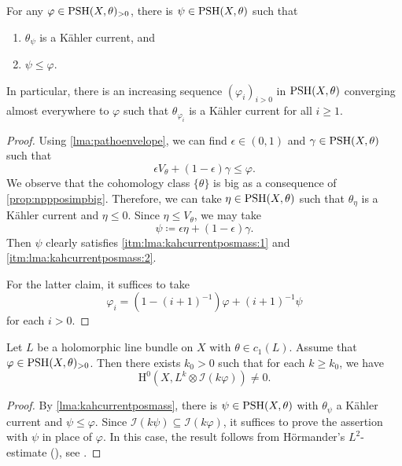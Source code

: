 \begin{lemma}\label{lma:kahcurrentposmass}
    For any $\varphi\in \mathrm{PSH}(X,\theta)_{>0}$, there is $\psi\in \mathrm{PSH}(X,\theta)$ such that
    \begin{enumerate}
        \item\label{itm:lma:kahcurrentposmass:1} $\theta_{\psi}$ is a Kähler current, and
        \item\label{itm:lma:kahcurrentposmass:2} $\psi\leq \varphi$.
    \end{enumerate}
    In particular, there is an increasing sequence $(\varphi_i)_{i>0}$ in $\mathrm{PSH}(X,\theta)$ converging almost everywhere to $\varphi$ such that $\theta_{\varphi_i}$ is a K\"ahler current for all $i\geq 1$.
\end{lemma}
\begin{proof}
    Using \cref{lma:pathoenvelope}, we can find $\epsilon\in (0,1)$ and $\gamma\in \mathrm{PSH}(X,\theta)$ such that
    \[
    \epsilon V_{\theta}+(1-\epsilon)\gamma\leq \varphi.
    \]
    We observe that the cohomology class $\{\theta\}$ is big as a consequence of \cref{prop:nppposimpbig}. Therefore, we can take $\eta\in \mathrm{PSH}(X,\theta)$ such that $\theta_{\eta}$ is a Kähler current and $\eta\leq 0$. Since $\eta\leq V_{\theta}$, we may take
    \[
    \psi\coloneqq \epsilon\eta+(1-\epsilon)\gamma.
    \]
    Then $\psi$ clearly satisfies \ref{itm:lma:kahcurrentposmass:1} and \ref{itm:lma:kahcurrentposmass:2}.

    For the latter claim, it suffices to take
    \[
    \varphi_i=\left(1-(i+1)^{-1}\right)\varphi +(i+1)^{-1}\psi
    \]
    for each $i>0$.
\end{proof}

\begin{lemma}\label{lma:existsecposmass}
    Let $L$ be a holomorphic line bundle on $X$ with $\theta\in c_1(L)$. Assume that $\varphi\in \mathrm{PSH}(X,\theta)_{>0}$. Then there exists $k_0>0$ such that for each $k\geq k_0$, we have
    \[
        \mathrm{H}^0\left(X,L^k\otimes \mathcal{I}(k\varphi)\right)\neq 0.
    \]
\end{lemma}

\begin{proof}
    By \cref{lma:kahcurrentposmass}, there is $\psi\in \mathrm{PSH}(X,\theta)$ with $\theta_{\psi}$ a Kähler current and $\psi\leq\varphi$. Since $\mathcal{I}(k\psi)\subseteq \mathcal{I}(k\varphi)$, it suffices to prove the assertion with $\psi$ in place of $\varphi$. In this case, the result follows from Hörmander's $L^2$-estimate (\cite{Hor66}), see \cite[Theorem~13.21]{Dem12}.
\end{proof}


